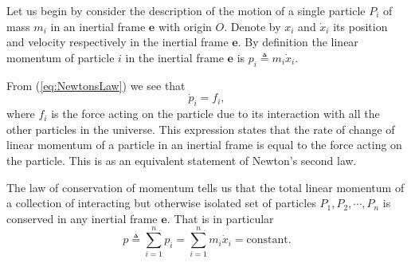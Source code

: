 \documentclass[graybox,envcountchap,sectrefs]{svmonoMuga}
\begin{document}
Let us begin by consider the description of the motion of a single particle $P_i$ of mass $m_i$ in an inertial frame $\mathbf{e}$ with origin $O$. Denote by $x_i$ and $\dot{x}_i$ its position and velocity respectively in the inertial frame $\mathbf{e}$. By definition the linear momentum of particle $i$ in the inertial frame $\mathbf{e}$ is $p_i\triangleq m_i\dot{x}_i$.
\begin{svgraybox}
From (\ref{eq:NewtonsLaw}) we see that 
\[
\dot{p}_i=f_i,
\]
where $f_i$ is the force acting on the particle due to its interaction with all the other particles in the universe.
This expression states that the rate of change of linear momentum of a particle in an inertial frame is equal to the force acting on the particle. This is as an equivalent statement of Newton's second law. 
\end{svgraybox}
The law of conservation of momentum tells us that the total linear momentum of a collection of interacting but otherwise isolated set of particles $P_1,P_2,\cdots,P_n$ is conserved in any inertial frame 
$\mathbf{e}$. That is in particular
\[
p\triangleq \sum_{i=1}^np_i=\sum_{i=1}^nm_i\dot{x}_i=\mathrm{constant}.
\]
\end{document}

